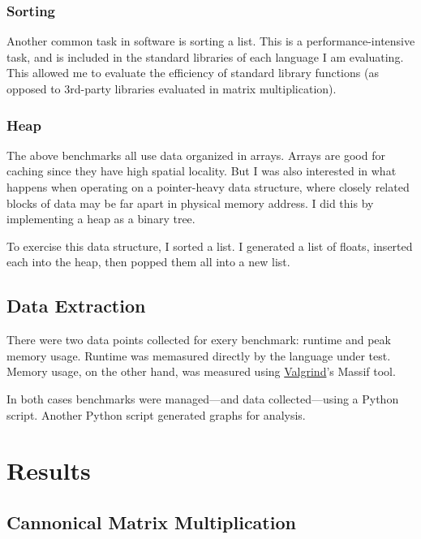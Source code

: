 \documentclass[12pt,letterpaper]{article}
\begin{document}
\subsubsection{Sorting}

Another common task in software is sorting a list. This is a
performance-intensive task, and is included in the standard libraries of each
language I am evaluating. This allowed me to evaluate the efficiency of standard
library functions (as opposed to 3rd-party libraries evaluated in matrix
multiplication).

\subsubsection{Heap}

The above benchmarks all use data organized in arrays. Arrays are good for
caching since they have high spatial locality. But I was also interested in
what happens when operating on a pointer-heavy data structure, where closely
related blocks of data may be far apart in physical memory address. I did this
by implementing a heap as a binary tree.

To exercise this data structure, I sorted a list. I generated a list of
floats, inserted each into the heap, then popped them all into a new list.

\subsection{Data Extraction}

There were two data points collected for exery benchmark: runtime and peak
memory usage. Runtime was memasured directly by the language under test. Memory
usage, on the other hand, was measured using
\href{https://valgrind.org/}{Valgrind}'s Massif tool.

In both cases benchmarks were managed—and data collected—using a Python
script. Another Python script generated graphs for analysis.

\section{Results}

\subsection{Cannonical Matrix Multiplication}\label{matmul-cannonical}
\end{document}
